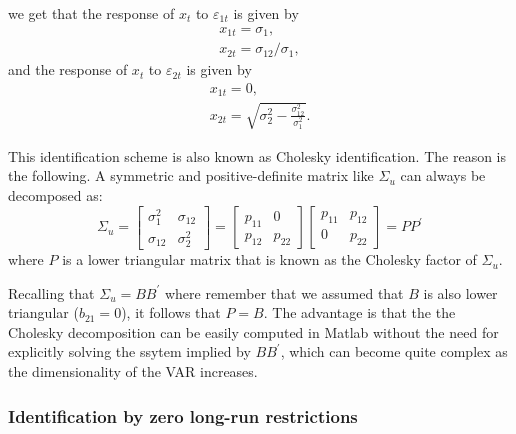 \documentclass[10pt]{article}
\begin{document}
we get that the response of $x_{t}$ to $\varepsilon _{1t}$ is given by%
\begin{equation*}
\begin{array}{c}
x_{1t}=\sigma _{1}, \\ 
x_{2t}=\sigma _{12}/\sigma _{1},%
\end{array}%
\end{equation*}%
and the response of $x_{t}$ to $\varepsilon _{2t}$ is given by 
\begin{equation*}
\begin{array}{c}
x_{1t}=0, \\ 
x_{2t}=\sqrt{\sigma _{2}^{2}-\frac{\sigma _{12}^{2}}{\sigma _{1}^{2}}}.%
\end{array}%
\end{equation*}

This identification scheme is also known as Cholesky identification. The
reason is the following. A symmetric and positive-definite matrix like $%
\Sigma _{u}$ can always be decomposed as:%
\begin{equation*}
\Sigma _{u}=\left[ 
\begin{array}{cc}
\sigma _{1}^{2} & \sigma _{12} \\ 
\sigma _{12} & \sigma _{2}^{2}%
\end{array}%
\right] =\left[ 
\begin{array}{cc}
p_{11} & 0 \\ 
p_{12} & p_{22}%
\end{array}%
\right] \left[ 
\begin{array}{cc}
p_{11} & p_{12} \\ 
0 & p_{22}%
\end{array}%
\right] =PP^{\prime }
\end{equation*}%
where $P$ is a lower triangular matrix that is known as the Cholesky factor
of $\Sigma _{u}$.

Recalling that $\Sigma _{u}=BB^{\prime }$ where remember that we assumed
that $B$ is also lower triangular ($b_{21}=0$), it follows that $P=B$. The
advantage is that the the Cholesky decomposition can be easily computed in
Matlab without the need for explicitly solving the ssytem implied by $%
BB^{\prime }$, which can become quite complex as the dimensionality of the
VAR increases.

\subsubsection{Identification by zero long-run restrictions}
\end{document}
